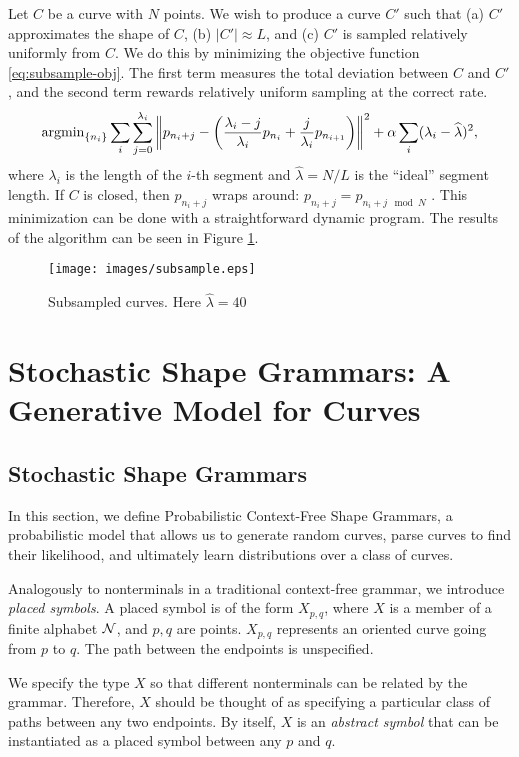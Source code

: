\documentclass{article}
\begin{document}
Let $C$ be a curve with $N$ points. We wish to produce a curve $C'$
such that (a) $C'$ approximates the shape of $C$, (b) $|C'| \approx
L$, and (c) $C'$ is sampled relatively uniformly from $C$. We do this
by minimizing the objective function \eqref{eq:subsample-obj}. The first
term measures the total deviation between $C$ and $C'$, and the second
term rewards relatively uniform sampling at the correct rate.
\begin{equation}
\operatorname{argmin}_{ \{n_i \} } \sum_i \sum_{j=0}^{\lambda_i} \left\| p_{n_i+j} -
  \left( \frac{\lambda_i - j}{\lambda_i} p_{n_i} + \frac{j}{\lambda_i}
    p_{n_{i+1}} \right) \right\|^2 + \alpha \sum_i (\lambda_i -
\widehat{\lambda})^2,\label{eq:subsample-obj}
\end{equation}
where $\lambda_i$ is the length of the $i$-th
segment and $\widehat{\lambda} = N/L$ is the ``ideal'' segment
length. If $C$ is closed, then $p_{n_i + j}$ wraps around: $p_{n_i +
  j} = p_{n_i+j \mod N}$ . This minimization can be done with a
straightforward dynamic program. The results of the algorithm can be
seen in Figure \ref{fig-subsample}.
\begin{figure}[h]
\centering
\texttt{[image: images/subsample.eps]} 
\caption{Subsampled curves. Here $\widehat{\lambda} = 40$}
\label{fig-subsample}
\end{figure}


\section{Stochastic Shape Grammars: A Generative Model for Curves}
\label{sec-pcfsg}

\subsection{Stochastic Shape Grammars}

In this section, we define Probabilistic Context-Free Shape Grammars,
a probabilistic model that allows us to generate random curves, parse
curves to find their likelihood, and ultimately learn distributions
over a class of curves.

Analogously to nonterminals in a traditional context-free grammar, we
introduce {\em placed symbols}. A placed symbol is of the form
$X_{p,q}$, where $X$ is a member of a finite alphabet ${\mathcal N}$, and
$p,q$ are points. $X_{p,q}$ represents an oriented curve going from
$p$ to $q$. The path between the endpoints is unspecified.

We specify the type $X$ so that different nonterminals can be related
by the grammar. Therefore, $X$ should be thought of as specifying a
particular class of paths between any two endpoints. By itself, $X$ is
an {\em abstract symbol} that can be instantiated as a placed symbol
between any $p$ and $q$.
\end{document}
